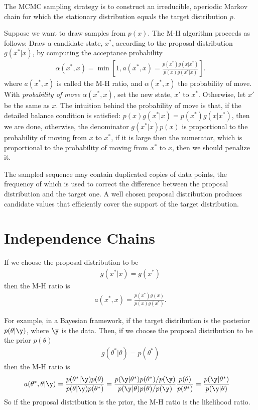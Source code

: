 \documentclass{book}
\begin{document}
The MCMC sampling strategy is to construct an irreducible, aperiodic Markov chain for which the stationary distribution equals the target distribution $p$.

Suppose we want to draw samples from $p(x)$. The M-H algorithm proceeds as follows: Draw a candidate state, $x^*$, according to the proposal distribution $g(x^*|x)$, by computing the acceptance probability
\begin{align}
\alpha(x^*, x) = \min\left[1, a(x^*,x) = \frac{p(x^*)g(x|x^*)}{p(x)g(x^*|x)}\right].
\end{align}
where $a(x^*,x)$ is called the M-H ratio, and $\alpha(x^*,x)$ the probability of move. With {\em{probability of move}} $\alpha(x^*, x)$, set the new state, $x'$ to $x^*$. Otherwise, let $x'$ be the same as $x$. The intuition behind the probability of move is that, if the detailed balance condition is satisfied: $p(x)g(x^*|x) = p(x^*)g(x|x^*)$, then we are done, otherwise, the denominator $g(x^*|x)p(x)$ is proportional to the probability of moving from $x$ to $x^*$, if it is large then the numerator, which is proportional to the probability of moving from $x^*$ to $x$, then we should penalize it.

The sampled sequence may contain duplicated copies of data points, the frequency of which is used to correct the difference between the proposal distribution and the target one. A well chosen proposal distribution produces candidate values that efficiently cover the support of the target distribution.

\section{Independence Chains}
If we choose the proposal distribution to be
\begin{align}
g(x^*|x) = g(x^*)
\end{align}
then the M-H ratio is
\begin{align}
a(x^*, x) = \frac{p(x^*)g(x)}{p(x)g(x^*)}.
\end{align}

For example, in a Bayesian framework, if the target distribution is the posterior $p(\theta|\y)$, where $\y$ is the data. Then, if we choose the proposal distribution to be the prior $p(\theta)$
\begin{align}
g(\theta^*|\theta) = p(\theta^*)
\end{align}
then the M-H ratio is
\begin{align}
a(\theta^*, \theta | \y) &= \frac{p(\theta^*|\y)p(\theta)}{p(\theta|\y)p(\theta^*)} = \frac{p(\y|\theta^*)p(\theta^*)/p(\y)}{p(\y|\theta)p(\theta)/p(\y)}\frac{p(\theta)}{p(\theta^*)} = \frac{p(\y|\theta^*)}{p(\y|\theta)}
\end{align}
So if the proposal distribution is the prior, the M-H ratio is the likelihood ratio.
\end{document}
